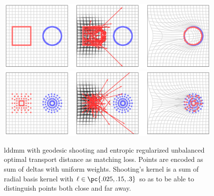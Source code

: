 \documentclass[11pt]{article}
\begin{document}
\begin{center} 
\begin{figure}[h!]
    \includegraphics[width=\textwidth]{assets/plt_lddmm_points_False_summary} 
    \includegraphics[width=\textwidth]{assets/plt_lddmm_points_True_summary} 
    \caption{lddmm with geodesic shooting and entropic regularized unbalanced optimal transport distance as matching loss. Points are encoded as sum of deltas with uniform weights. Shooting's kernel is a sum of radial basis kernel with $\ell \in \pc{.025,.15,.3}$ so as to be able to distinguish points both close and far away. }
    \label{fig:plt_lddmm_points}
\end{figure}
\end{center} 
    
  



\newpage
\printbibliography 
\end{document}
